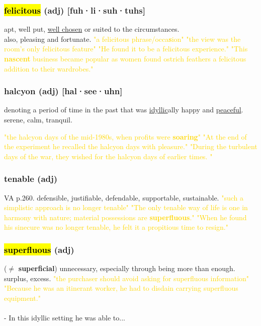 \documentclass{proc}
\begin{document}
	\subsubsection{\textcolor{brickred}{\hl{felicitous}} (adj) [fuh·li·suh·tuhs]}
	apt, well put, \underline{well chosen} or suited to the circumstances.\\
	also, pleasing and fortunate.
	\textcolor{gold}{"a felicitous phrase/occa\textbf{s}ion" "the view was the room's only felicitous feature" "He found 
		it to be a felicitous experience." "This \textbf{nascent} business became 
		popular as women found ostrich feathers a felicitous addition to their 
		wardrobes."}
	
	\subsubsection{\textcolor{brickred}{halcyon} (adj) [hal·see·uhn]}
	denoting a period of time in the past that was \underline{idyllic}ally happy and \underline{peaceful}. 
	serene,
	calm, tranquil.
	
	\textcolor{gold}{"the halcyon days of the mid-1980s, when profits were \textbf{soaring}" "At the end of the experiment he recalled the halcyon days with pleasure." "During the turbulent days of the war, they wished for the halcyon days of earlier times. "}
	
	\subsubsection{\textcolor{brickred}{tenable} (adj)}
	VA p.260.
	defensible,
	justifiable,
	defendable,
	supportable,
	sustainable.
	\textcolor{gold}{"such a simplistic approach is no longer tenable" "The only tenable way of life is one in 
		harmony with nature; material possessions are \textbf{superfluous}." "When he found his sinecure was no longer tenable, he felt it a propitious time to resign."}
	
	\subsubsection{\textcolor{brickred}{\hl{superfluous}} (adj)}
	($\ne$ \textbf{superficial}) unnecessary, especially through being more than enough. surplus, excess.
	\textcolor{gold}{"the purchaser should avoid asking for superfluous information" "Because he was an itinerant worker, he had to disdain carrying superfluous equipment."}\\\\
	- In this idyllic setting he was able to...
	
\end{document}
